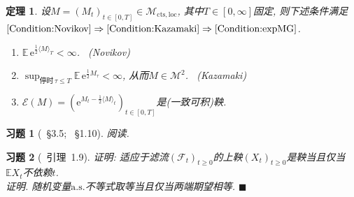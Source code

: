 \documentclass{ctexart}
\theoremstyle{definition}
\theoremstyle{remark}
\theoremstyle{plain}
\newtheorem{Thm}[Def]{定理}
\newtheorem{Ex}{习题}[section]
\newenvironment{Prf}{\vspace{1ex}\textbf{\\}{\color{red}\textit{证明}}.\normalfont}{\color{red}\hfill$\blacksquare$\vspace{1ex}\par}
\newcommand{\1}{\mathbbm{1}}				%
\newcommand{\as}{\mathrm{a.s.}}				%
\newcommand{\E}{\mathbb{E}}					%
\newcommand{\agp}[1]{\langle #1 \rangle}	%
\newcommand{\e}{\mathrm{e}}
\begin{document}
\begin{Thm}\label{Thm:expMG}
设$M = (M_{t})_{t \in [0,T]} \in \mathcal{M}_{\mathrm{cts},\mathrm{loc}}$, 其中$T \in [0,\infty]$固定, 则下述条件满足$\eqref{Condition:Novikov}\Rightarrow\eqref{Condition:Kazamaki}\Rightarrow\eqref{Condition:expMG}$.
\begin{enumerate}
	\setlength{\itemsep}{0ex}
\item\label{Condition:Novikov} $\E\,\e^{\frac{1}{2}\agp{M}_{T}} < \infty$. \ {\normalfont (Novikov)}
\item\label{Condition:Kazamaki} $\sup_{\text{停时}\,\tau \le T} \E\,\e^{\frac{1}{2}M_{\tau}} < \infty$, 从而$M \in \mathcal{M}^{2}$. \ {\normalfont (Kazamaki)}
\item\label{Condition:expMG} $\mathcal{E}(M) = (\e^{M_{t}-\frac{1}{2}\agp{M}_{t}})_{t \in [0,T]}$是(一致可积)鞅.
\end{enumerate}
\end{Thm}


\begin{Ex}[\cite{Karatzas-Shreve--GTM113}~\S3.5; \cite{龚光鲁-钱敏平}~\S1.10]
阅读.
\end{Ex}


\begin{Ex}[\cite{龚光鲁-钱敏平}~引理~1.9]
证明: 适应于滤流$(\mathscr{F}_{t})_{t \ge 0}$的上鞅$(X_{t})_{t \ge 0}$是鞅当且仅当$\E X_{t}$不依赖$t$.
\begin{Prf}
随机变量$\as$不等式取等当且仅当两端期望相等.
\end{Prf}
\end{Ex}
\end{document}
